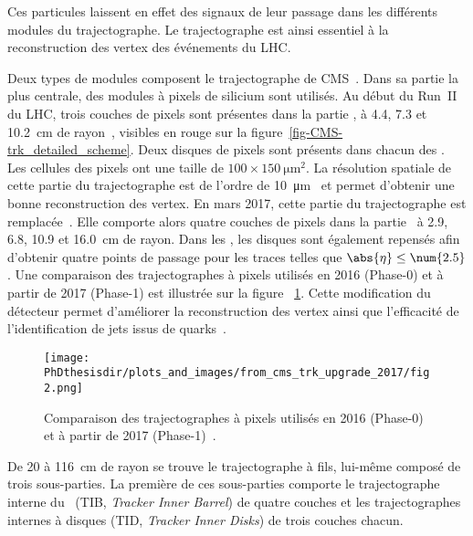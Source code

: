 Ces particules laissent en effet des signaux de leur passage dans les différents modules du trajectographe.
Le trajectographe est ainsi essentiel à la reconstruction des vertex des événements du LHC.
\par Deux types de modules composent le trajectographe de CMS~\cite{cms_paper,CERN-LHCC-98-006,CMS-TDR-11,CMS-TRK-11-001,CMS-TRK-17-001}.
Dans sa partie la plus centrale, des modules à pixels de silicium sont utilisés.
Au début du Run~II du LHC, trois couches de pixels sont présentes dans la partie \CMSbarrel, à \num{4.4}, \num{7.3} et \SI{10.2}{\centi\meter} de rayon~\cite{cms_paper}, visibles en rouge sur la figure~\ref{fig-CMS-trk_detailed_scheme}.
Deux disques de pixels sont présents dans chacun des \CMSendcaps.
Les cellules des pixels ont une taille de $\num{100}\times\SI{150}{\micro\meter^2}$.
La résolution spatiale de cette partie du trajectographe est de l'ordre de \SI{10}{\micro\meter}~\cite{cms_paper} et permet d'obtenir une bonne reconstruction des vertex.
En mars 2017, cette partie du trajectographe est remplacée~\cite{CMS-TDR-11,cms_trk_upgrade_2017}.
Elle comporte alors quatre couches de pixels dans la partie \CMSbarrel\ à \num{2.9}, \num{6.8}, \num{10.9} et \SI{16.0}{\centi\meter} de rayon.
Dans les \CMSendcaps, les disques sont également repensés afin d'obtenir quatre points de passage pour les traces telles que $\abs{\eta}\leq\num{2.5}$.
Une comparaison des trajectographes à pixels utilisés en 2016 (Phase-0) et à partir de 2017 (Phase-1) est illustrée sur la figure ~\ref{fig-chapter-LHC-section-CMS-subsec-tracker-2017-upgrade}.
Cette modification du détecteur permet d'améliorer la reconstruction des vertex ainsi que l'efficacité de l'identification de jets issus de quarks~\quarkb.
\begin{figure}[t]
\centering
\texttt{[image: \\PhDthesisdir/plots\_and\_images/from\_cms\_trk\_upgrade\_2017/fig2.png]}
\caption[Comparaison des trajectographes à pixels utilisés en 2016 et à partir de 2017.]{Comparaison des trajectographes à pixels utilisés en 2016 (Phase-0) et à partir de 2017 (Phase-1)~\cite{CMS-TDR-11,cms_trk_upgrade_2017}.}
\label{fig-chapter-LHC-section-CMS-subsec-tracker-2017-upgrade}
\end{figure}
\par De \num{20} à \SI{116}{\centi\meter} de rayon se trouve le trajectographe à fils, lui-même composé de trois sous-parties.
La première de ces sous-parties comporte le trajectographe interne du \CMSbarrel\ (TIB, \emph{Tracker Inner Barrel}) de quatre couches et les trajectographes internes à disques (TID, \emph{Tracker Inner Disks}) de trois couches chacun.
